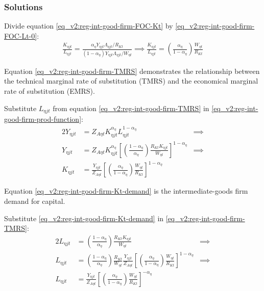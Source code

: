 \documentclass[../thesis.tex]{subfiles}
\begin{document}
\subsubsection*{Solutions}

Divide equation \ref{eq_v2:reg-int-good-firm-FOC-Kt} by \ref{eq_v2:reg-int-good-firm-FOC-Lt-0}:
\begin{align}
	\frac{K_{\eta jt}}{L_{\eta jt}} = \frac{{\alpha_{\eta}} Y_{\eta jt} \Lambda_{\eta jt} /R_{Kt}}{(1-\alpha_{\eta}) Y_{\eta jt} \Lambda_{\eta jt} /W_{\eta t}} \implies
	\frac{K_{\eta jt}}{L_{\eta jt}} = \left( \frac{{\alpha_{\eta}}}{1-\alpha_{\eta}} \right) \frac{W_{\eta t}}{R_{Kt}} \label{eq_v2:reg-int-good-firm-TMRS}
\end{align}

Equation \ref{eq_v2:reg-int-good-firm-TMRS} demonstrates the relationship between the technical marginal rate of substitution (TMRS) and the economical marginal rate of substitution (EMRS). 

Substitute $L_{\eta jt}$ from equation \ref{eq_v2:reg-int-good-firm-TMRS} in \ref{eq_v2:reg-int-good-firm-prod-function}:
\begin{alignat}{2}
	Y_{\eta jt} & = Z_{A\eta t} K_{\eta jt}^{\alpha_{\eta}} L_{\eta jt}^{1-\alpha_{\eta}} &\implies \nonumber \\
	Y_{\eta jt} & = Z_{A\eta t} K_{\eta jt}^{\alpha_{\eta}} \left[ \left( \frac{1-\alpha_{\eta}}{{\alpha_{\eta}}} \right) \frac{R_{Kt} K_{\eta jt}}{W_{\eta t}} \right]^{1-\alpha_{\eta}} &\implies \nonumber \\
	K_{\eta jt} & = \frac{Y_{\eta jt}}{Z_{A\eta t}} \left[ \left( \frac{{\alpha_{\eta}}}{1-\alpha_{\eta}} \right) \frac{W_{\eta t}}{R_{Kt}}\right]^{1-\alpha_{\eta}} \label{eq_v2:reg-int-good-firm-Kt-demand}
\end{alignat}

Equation \ref{eq_v2:reg-int-good-firm-Kt-demand} is the intermediate-goods firm demand for capital. 

Substitute \ref{eq_v2:reg-int-good-firm-Kt-demand} in \ref{eq_v2:reg-int-good-firm-TMRS}:
\begin{alignat}{2}
	L_{\eta jt} & = \left( \frac{1-\alpha_{\eta}}{{\alpha_{\eta}}} \right) \frac{R_{Kt} K_{\eta jt}}{W_{\eta t}} &\implies \nonumber \\
	L_{\eta jt} & = \left( \frac{1-\alpha_{\eta}}{{\alpha_{\eta}}} \right) \frac{R_{Kt}}{W_{\eta t}} \frac{Y_{\eta jt}}{Z_{A\eta t}} \left[ \left( \frac{{\alpha_{\eta}}}{1-\alpha_{\eta}} \right) \frac{W_{\eta t}}{R_{Kt}}\right]^{1-\alpha_{\eta}} &\implies \nonumber \\
	L_{\eta jt} & = \frac{Y_{\eta jt}}{Z_{A\eta t}} \left[ \left( \frac{{\alpha_{\eta}}}{1-\alpha_{\eta}} \right) \frac{W_{\eta t}}{R_{Kt}}\right]^{-{\alpha_{\eta}}} \label{eq_v2:reg-int-good-firm-Lt-demand}
\end{alignat}
\end{document}
